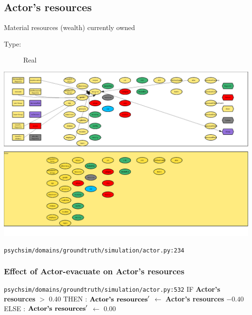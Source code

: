 \documentclass{article}%
\begin{document}
\subsection{Actor's resources}%
\label{subsec:Actor's resources}%
Material resources (wealth) currently owned%
\begin{description}%
\item[Type:]%
Real%
\end{description}%
\includegraphics[width=\textwidth]{images/resourcesOfActor.png}%
\begin{flushleft}%
\verb|psychsim/domains/groundtruth/simulation/actor.py:234|%
\end{flushleft}%
\subsubsection{Effect of Actor{-}evacuate on Actor's resources}%
\label{ssubsec:Effect of Actor{-}evacuate on Actor's resources}%
\begin{flushleft}%
\verb|psychsim/domains/groundtruth/simulation/actor.py:532|%
\linebreak%
IF %
\textbf{Actor's resources}%
$>$%
0.40%
\linebreak%
\hspace*{2em}%
THEN %
: %
$\mbox{\textbf{Actor's resources}} '$%
$\leftarrow$%
\textbf{Actor's resources}%
${-}0.40$%
\linebreak%
\hspace*{2em}%
ELSE %
: %
$\mbox{\textbf{Actor's resources}} '$%
$\leftarrow$%
0.00%
\end{flushleft}

%
\end{document}
